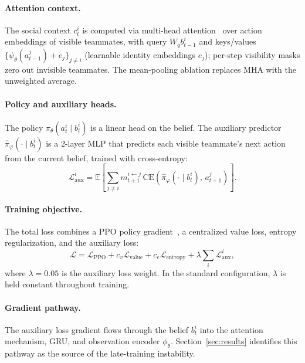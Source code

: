 \documentclass{article}
\theoremstyle{plain}
\theoremstyle{definition}
\theoremstyle{remark}
\begin{document}
\paragraph{Attention context.}
The social context $c_t^i$ is computed via multi-head
attention~\cite{vaswani2017attention} over action embeddings of
visible teammates, with query $W_q b_{t-1}^i$ and keys/values
$\{\psi_\theta(a_{t-1}^j) + e_j\}_{j \neq i}$ (learnable identity
embeddings $e_j$); per-step visibility masks zero out invisible
teammates. The mean-pooling ablation replaces MHA with the
unweighted average.

\paragraph{Policy and auxiliary heads.}
The policy $\pi_\theta(a_t^i \mid b_t^i)$ is a linear head on the belief.
The auxiliary predictor $\hat{\pi}_\varphi(\cdot \mid b_t^i)$ is a 2-layer
MLP that predicts each visible teammate's next action from the current
belief, trained with cross-entropy:
\begin{equation}
    \mathcal{L}_{\mathrm{aux}}^i = \mathbb{E}\left[
        \sum_{j \neq i} m_{t+1}^{i \leftarrow j}\,
        \mathrm{CE}(\hat{\pi}_\varphi(\cdot \mid b_t^i),\, a_{t+1}^j)
    \right].
\end{equation}

\paragraph{Training objective.}
The total loss combines a PPO policy gradient~\cite{schulman2017ppo}, a centralized value loss, entropy
regularization, and the auxiliary loss:
\begin{equation}
    \mathcal{L} = \mathcal{L}_{\mathrm{PPO}} +
    c_v \mathcal{L}_{\mathrm{value}} +
    c_e \mathcal{L}_{\mathrm{entropy}} +
    \lambda \sum_i \mathcal{L}_{\mathrm{aux}}^i,
\end{equation}
where $\lambda = 0.05$ is the auxiliary loss weight. In the standard
configuration, $\lambda$ is held constant throughout training.

\paragraph{Gradient pathway.} The auxiliary loss gradient flows
through the belief $b_t^i$ into the attention mechanism, GRU, and
observation encoder $\phi_\theta$. Section~\ref{sec:results} identifies
this pathway as the source of the late-training instability.
\end{document}
